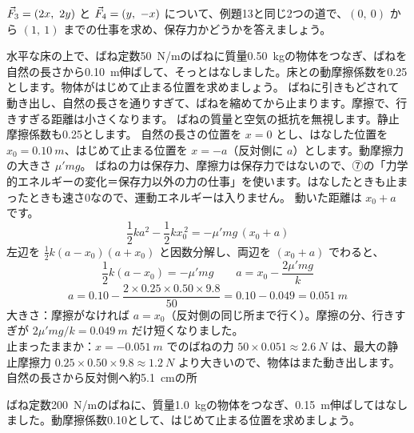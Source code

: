 \begin{jibun}
$\vec{F}_3=(2x,\ 2y)$ と $\vec{F}_4=(y,\ -x)$ について、例題13と同じ2つの道で、$(0,\ 0)$ から $(1,\ 1)$ までの仕事を求め、保存力かどうかを答えましょう。
\end{jibun}

\label{ph:力-4:ex14}
\begin{phreidai}
水平な床の上で、ばね定数\qty{50}{N/m}のばねに質量\qty{0.50}{kg}の物体をつなぎ、ばねを自然の長さから\qty{0.10}{m}伸ばして、そっとはなしました。床との動摩擦係数を0.25とします。物体がはじめて止まる位置を求めましょう。
\phbamen
ばねに引きもどされて動き出し、自然の長さを通りすぎて、ばねを縮めてから止まります。摩擦で、行きすぎる距離は小さくなります。
\phmushi
ばねの質量と空気の抵抗を無視します。静止摩擦係数も0.25とします。
\phzu
自然の長さの位置を $x=0$ とし、はなした位置を $x_0=\qty{0.10}{m}$、はじめて止まる位置を $x=-a$（反対側に $a$）とします。動摩擦力の大きさ $\mu'mg$。
\phriyu
ばねの力は保存力、摩擦力は保存力ではないので、⑦の「力学的エネルギーの変化＝保存力以外の力の仕事」を使います。はなしたときも止まったときも速さ0なので、運動エネルギーは入りません。
\phtateru
動いた距離は $x_0+a$ です。
\[\frac{1}{2}ka^2-\frac{1}{2}kx_0^{\,2}=-\mu'mg\,(x_0+a)\]
\phtoku
左辺を $\tfrac{1}{2}k(a-x_0)(a+x_0)$ と因数分解し、両辺を $(x_0+a)$ でわると、
\[\frac{1}{2}k(a-x_0)=-\mu'mg\qquad a=x_0-\frac{2\mu'mg}{k}\]
\[a=0.10-\frac{2\times0.25\times0.50\times9.8}{50}=0.10-0.049=\qty{0.051}{m}\]
\phtashikame
大きさ：摩擦がなければ $a=x_0$（反対側の同じ所まで行く）。摩擦の分、行きすぎが $2\mu'mg/k=\qty{0.049}{m}$ だけ短くなりました。\\
止まったままか：$x=\qty{-0.051}{m}$ でのばねの力 $50\times0.051\approx\qty{2.6}{N}$ は、最大の静止摩擦力 $0.25\times0.50\times9.8\approx\qty{1.2}{N}$ より大きいので、物体はまた動き出します。
\kotae 自然の長さから反対側へ約\qty{5.1}{cm}の所
\end{phreidai}
\begin{jibun}
ばね定数\qty{200}{N/m}のばねに、質量\qty{1.0}{kg}の物体をつなぎ、\qty{0.15}{m}伸ばしてはなしました。動摩擦係数0.10として、はじめて止まる位置を求めましょう。
\end{jibun}

